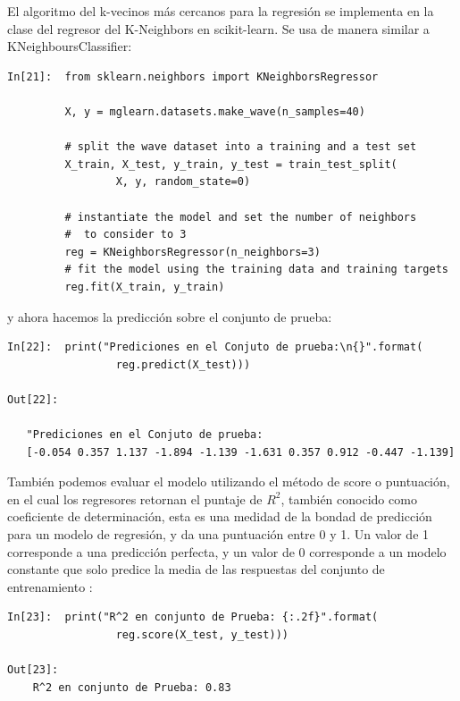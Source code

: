{El algoritmo del k-vecinos más cercanos para la regresión se implementa en la clase del regresor del  K-Neighbors  en {\ttfamily scikit-learn}. Se usa de manera similar a {\ttfamily KNeighboursClassifier}:\\


\begin{lstlisting}
In[21]:  from sklearn.neighbors import KNeighborsRegressor

         X, y = mglearn.datasets.make_wave(n_samples=40)
         
         # split the wave dataset into a training and a test set
         X_train, X_test, y_train, y_test = train_test_split(
                 X, y, random_state=0)

         # instantiate the model and set the number of neighbors 
         #  to consider to 3
         reg = KNeighborsRegressor(n_neighbors=3)
         # fit the model using the training data and training targets
         reg.fit(X_train, y_train)
\end{lstlisting}

\noindent y ahora  hacemos la predicción sobre el conjunto de prueba:\\ 

 
\begin{lstlisting}
In[22]:  print("Prediciones en el Conjuto de prueba:\n{}".format(
                 reg.predict(X_test)))

Out[22]:

   "Prediciones en el Conjuto de prueba:
   [-0.054 0.357 1.137 -1.894 -1.139 -1.631 0.357 0.912 -0.447 -1.139]
\end{lstlisting}


También podemos evaluar el modelo utilizando el método de score o puntuación, en el cual los regresores retornan  el puntaje de  $R^{2}$, también conocido como coeficiente de determinación, esta es una medidad
de la bondad de  predicción para un modelo de regresión, y da una puntuación entre 0
y 1. Un valor de 1 corresponde a una predicción perfecta, y un valor de 0 corresponde
a un modelo constante que solo predice la media de las respuestas del conjunto de entrenamiento {}:\\


\begin{lstlisting}
In[23]:  print("R^2 en conjunto de Prueba: {:.2f}".format(
                 reg.score(X_test, y_test)))

Out[23]:
    R^2 en conjunto de Prueba: 0.83
   

\end{lstlisting}}
